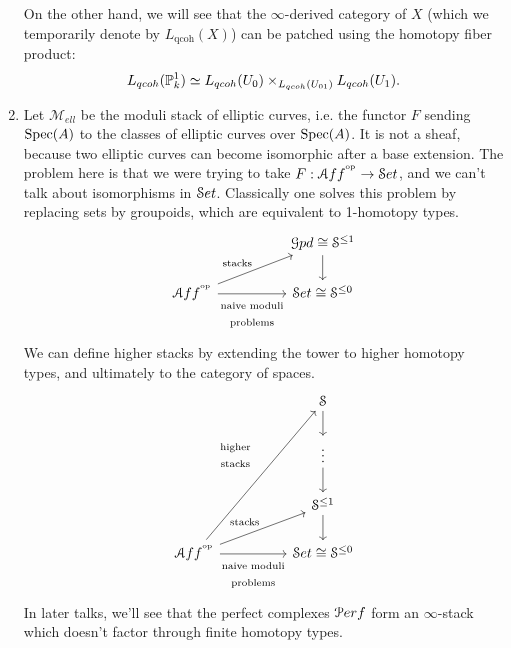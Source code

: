 \documentclass[10pt,a4paper,reqno,oneside]{book} %
\theoremstyle{plain}
\theoremstyle{definition}
\theoremstyle{remark}
\numberwithin{equation}{section}
\begin{document}
\begin{enumerate}
On the other hand, we will see that the $\infty$-derived category of $X$ (which we temporarily 
denote by $L_{\text{qcoh}}(X)$) can be patched using the homotopy fiber product:
\[	L_{qcoh}(\mathbb P^1_k) \simeq  L_{qcoh}(U_0) \times_{L_{qcoh}(U_{01})} L_{qcoh}(U_1) .\]

\item Let $\mathcal{M}_{ell}$ be the moduli stack of elliptic curves, i.e. the functor $F$ sending
$\operatorname{Spec}(A)$ to the classes of elliptic curves over $\operatorname{Spec}(A)$. It is not a sheaf, because two elliptic curves can become
isomorphic after a base extension. The problem here is that we were trying to take $F : \mathcal A ff^{^\mathrm{op}} \to \mathcal S et$, and we can't talk
about isomorphisms in $\mathcal S et$. Classically one solves this problem by replacing sets by groupoids, which are equivalent to
1-homotopy types.
\[
\begin{tikzcd}
\; & & \cG pd \cong \cS^{\leq 1}\arrow{d} \\
\cA ff^{\op}\arrow{urr}{\text{stacks}}\arrow[swap]{rr}{\begin{array}{c}\text{naive moduli}\\
\text{problems}\end{array}} & & \cS et \cong \cS^{\leq 0}
\end{tikzcd}
\]
We can define higher stacks by extending the tower to higher homotopy types, and ultimately to the category of spaces.
\[
\begin{tikzcd}
\; & &  \cS\arrow{d} \\
\; & &  \vdots\arrow{d} \\
\; & &  \cS^{\leq 1}\arrow{d} \\
\cA ff^{\op}\arrow{uuurr}{\begin{array}{c}\text{higher}\\\text{stacks}\end{array}}
\arrow{urr}{\text{stacks}}\arrow[swap]{rr}{\begin{array}{c}\text{naive moduli}\\\text{problems}\end{array}} & & 
\cS et \cong \cS^{\leq 0}
\end{tikzcd}
\]
In later talks, we'll
see that the perfect complexes $\mathcal P erf$ form an $\infty$-stack which doesn't factor through finite homotopy types.
\end{enumerate}
\end{document}
